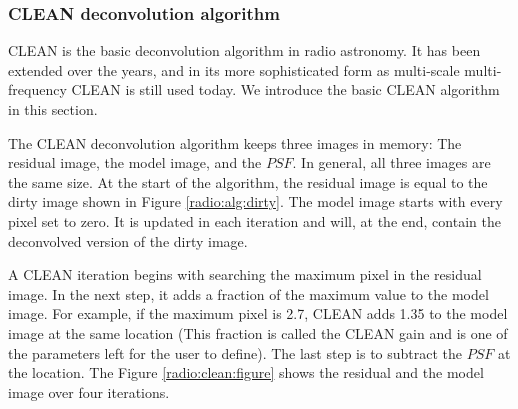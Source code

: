 \subsubsection{CLEAN deconvolution algorithm}
CLEAN\cite{hogbom1974aperture} is the basic deconvolution algorithm in radio astronomy. It has been extended over the years, and in its more sophisticated form as multi-scale multi-frequency CLEAN \cite{offringa2017optimized} is still used today. We introduce the basic CLEAN algorithm in this section.

The CLEAN deconvolution algorithm keeps three images in memory: The residual image, the model image, and the $PSF$. In general, all three images are the same size. At the start of the algorithm, the residual image is equal to the dirty image shown in Figure \ref{radio:alg:dirty}. The model image starts with every pixel set to zero. It is updated in each iteration and will, at the end, contain the deconvolved version of the dirty image.

A CLEAN iteration begins with searching the maximum pixel in the residual image. In the next step, it adds a fraction of the maximum value to the model image. For example, if the maximum pixel is 2.7, CLEAN adds 1.35 to the model image at the same location (This fraction is called the CLEAN gain and is one of the parameters left for the user to define). The last step is to subtract the $PSF$ at the location. The Figure \ref{radio:clean:figure} shows the residual and the model image over four iterations.

